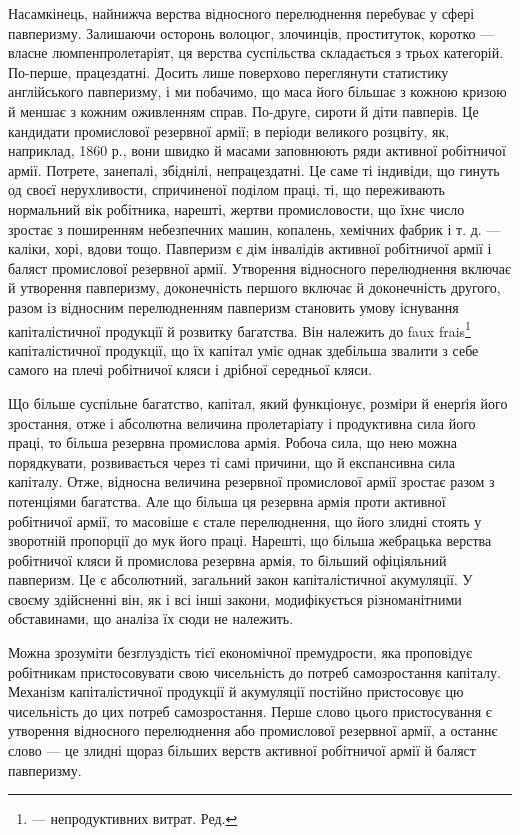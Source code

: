 Насамкінець, найнижча верства відносного перелюднення
перебуває у сфері павперизму. Залишаючи осторонь волоцюг,
злочинців, проституток, коротко — власне люмпенпролетаріят,
ця верства суспільства складається з трьох категорій. По-перше,
працездатні. Досить лише поверхово переглянути статистику
англійського павперизму, і ми побачимо, що маса його більшає
з кожною кризою й меншає з кожним оживленням справ. По-друге,
сироти й діти павперів. Це кандидати промислової резервної
армії; в періоди великого розцвіту, як, наприклад, 1860 р., вони
швидко й масами заповнюють ряди активної робітничої армії.
Потрете, занепалі, збіднілі, непрацездатні. Це саме ті індивіди,
що гинуть од своєї нерухливости, спричиненої поділом праці,
ті, що переживають нормальний вік робітника, нарешті, жертви
промисловости, що їхнє число зростає з поширенням небезпечних
машин, копалень, хемічних фабрик і т. д. — каліки, хорі,
вдови тощо. Павперизм є дім інвалідів активної робітничої армії
і баляст промислової резервної армії. Утворення відносного
перелюднення включає й утворення павперизму, доконечність
першого включає й доконечність другого, разом із відносним
перелюдненням павперизм становить умову існування капіталістичної
продукції й розвитку багатства. Він належить до faux
frais\footnote*{
— непродуктивних витрат. Ред.
} капіталістичної продукції, що їх капітал уміє однак здебільша
звалити з себе самого на плечі робітничої кляси і дрібної
середньої кляси.

Що більше суспільне багатство, капітал, який функціонує,
розміри й енерґія його зростання, отже і абсолютна величина пролетаріату
і продуктивна сила його праці, то більша резервна промислова
армія. Робоча сила, що нею можна порядкувати, розвивається
через ті самі причини, що й експансивна сила капіталу.
Отже, відносна величина резервної промислової армії зростає
разом з потенціями багатства. Але що більша ця резервна армія
проти активної робітничої армії, то масовіше є стале перелюднення,
що його злидні стоять у зворотній пропорції до мук його
праці. Нарешті, що більша жебрацька верства робітничої кляси
й промислова резервна армія, то більший офіціяльний павперизм.
Це є абсолютний, загальний закон капіталістичної акумуляції.
У своєму здійсненні він, як і всі інші закони, модифікується
різноманітними обставинами, що аналіза їх сюди не
належить.

Можна зрозуміти безглуздість тієї економічної премудрости,
яка проповідує робітникам пристосовувати свою чисельність до
потреб самозростання капіталу. Механізм капіталістичної продукції
й акумуляції постійно пристосовує цю чисельність до цих
потреб самозростання. Перше слово цього пристосування є утворення
відносного перелюднення або промислової резервної армії,
а останнє слово — це злидні щораз більших верств активної
робітничої армії й баляст павперизму.
